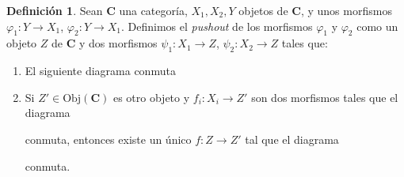 \documentclass[12pt,a4paper]{book}
\theoremstyle{definition} \newtheorem{defn}[thm]{Definición}
\theoremstyle{definition} \newtheorem{ejemplo}[thm]{Ejemplo}
\theoremstyle{definition} \newtheorem{ejercicio}[thm]{Ejercicio}
\theoremstyle{remark} \newtheorem*{obs}{Observación}
\def\obj{\mathrm{Obj}}
\def\cat{\mathbf{C}}
\begin{document}
 \begin{defn}
 Sean $\cat$ una categoría, $X_1,X_2,Y$ objetos de $\cat$, y unos morfismos $\varphi_1:Y\rightarrow X_1$, $\varphi_2:Y \rightarrow X_1$. Definimos el \emph{pushout} de los morfismos $\varphi_1$ y $\varphi_2$ como un objeto $Z$ de $\cat$ y dos morfismos $\psi_1:X_1\rightarrow Z$, $\psi_2:X_2\rightarrow Z$ tales que:
\begin{enumerate}[label=(\alph*)]
  \item\label{conmuta} El siguiente diagrama conmuta
    \begin{center}
  \end{center}

\item\label{inicial}  Si $Z'\in \obj(\cat)$ es otro objeto y $f_i:X_i \rightarrow Z'$ son dos morfismos tales que el diagrama
    \begin{center}
  \end{center}
    conmuta, entonces existe un único $f:Z\rightarrow Z'$ tal que el diagrama
    \begin{center}
  \end{center}
    conmuta.
\end{enumerate}
\end{defn}
\end{document}
